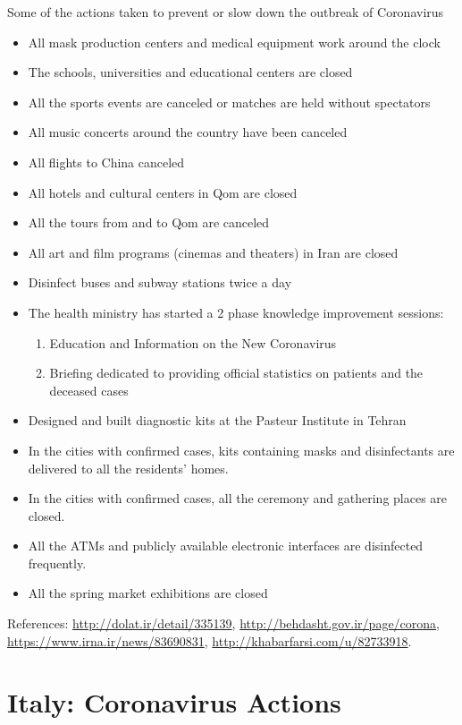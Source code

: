 \documentclass[onecolumn,journal]{IEEEtran}
\begin{document}
Some of the actions taken to prevent or slow down the outbreak of Coronavirus
\begin{itemize}
\item All mask production centers and medical equipment work around the clock
\item The schools, universities and educational centers are closed
\item All the sports events are canceled or matches are held without spectators
\item All music concerts around the country have been canceled
\item All flights to China canceled
\item All hotels and cultural centers in Qom are closed
\item All the tours from and to Qom are canceled
\item All art and film programs (cinemas and theaters) in Iran are closed
\item Disinfect buses and subway stations twice a day
\item The health ministry has started a 2 phase knowledge improvement sessions:
\begin{enumerate}
\item Education and Information on the New Coronavirus
\item Briefing dedicated to providing official statistics on patients and the deceased cases
\end{enumerate}
\item Designed and built diagnostic kits at the Pasteur Institute in Tehran
\item In the cities with confirmed cases, kits containing masks and disinfectants are delivered to all the residents' homes.
\item In the cities with confirmed cases, all the ceremony and gathering places are closed.
\item All the ATMs and publicly available electronic interfaces are disinfected frequently.
\item All the spring market exhibitions are closed
\end{itemize}

References: \url{http://dolat.ir/detail/335139}, 
\url{http://behdasht.gov.ir/page/corona}, \\
\url{https://www.irna.ir/news/83690831}, 
\url{http://khabarfarsi.com/u/82733918}.

\newpage

\section*{Italy: Coronavirus Actions}
\end{document}
